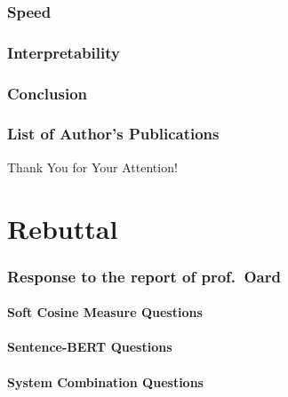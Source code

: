 \section{Speed}
\section{Interpretability}
\section{Conclusion}
\section{List of Author's Publications}

\begin{frame}[plain]
\vfill
\centerline{Thank You for Your Attention!}
\vfill\vfill
\end{frame}

\part{Rebuttal}
\frame{\vfill\partpage\vfill}

\section{Response to the report of prof.\ Oard}

\subsection{Soft Cosine Measure Questions}
\begin{frame}{\secname}
\end{frame}

\subsection{Sentence-BERT Questions}
\begin{frame}{\secname}
\end{frame}

\subsection{System Combination Questions}
\begin{frame}[fragile]{\secname}
\end{frame}

